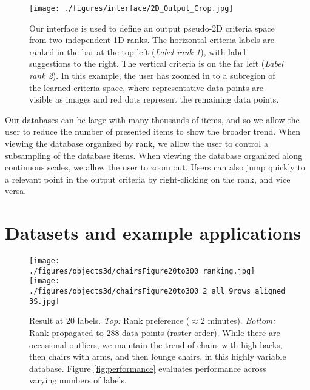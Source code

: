\documentclass{article}
\begin{document}
\begin{figure}[t]
\centering
\texttt{[image: ./figures/interface/2D\_Output\_Crop.jpg]}
\caption{Our interface is used to define an output pseudo-2D criteria space from two independent 1D ranks. The horizontal criteria labels are ranked in the bar at the top left (\emph{Label rank 1}), with label suggestions to the right. The vertical criteria is on the far left (\emph{Label rank 2}). In this example, the user has zoomed in to a subregion of the learned criteria space, where representative data points are visible as images and red dots represent the remaining data points.}
\label{fig:interface2}
\end{figure}

\begin{figure}[t]
\centering
{}
\end{figure}

Our databases can be large with many thousands of items, and so we allow the user to reduce the number of presented items to show the broader trend. When viewing the database organized by rank, we allow the user to control a subsampling of the database items. When viewing the database organized along continuous scales, we allow the user to zoom out. Users can also jump quickly to a relevant point in the output criteria by right-clicking on the rank, and vice versa.

\section{Datasets and example applications}
\label{s:databases}
\begin{figure}[t]
    \centering
		\texttt{[image: ./figures/objects3d/chairsFigure20to300\_ranking.jpg]}
		\texttt{[image: ./figures/objects3d/chairsFigure20to300\_2\_all\_9rows\_aligned3S.jpg]}
    \caption{Result at 20 labels. \emph{Top:} Rank preference ($\approx$2 minutes). \emph{Bottom:} Rank propagated to 288 data points (raster order). While there are occasional outliers, we maintain the trend of chairs with high backs, then chairs with arms, and then lounge chairs, in this highly variable database. Figure \ref{fig:performance} evaluates performance across varying numbers of labels.}
    \label{fig:objects}
\end{figure}
\end{document}
